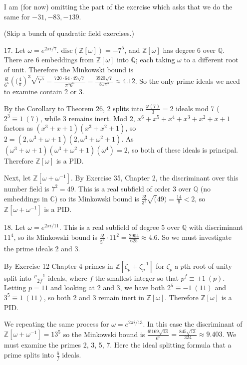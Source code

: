 \documentclass{article}
\newcommand{\w}[0]{\omega}
\newcommand{\z}[0]{\zeta}
\newcommand{\Q}[0]{\mathbb{Q}}
\newcommand{\C}[0]{\mathbb{C}}
\newcommand{\Z}[0]{\mathbb{Z}}
\newcommand{\disc}[1]{\text{disc}(#1)}
\newcommand{\modequiv}[3]{#1 \equiv #2\ (#3)}
\begin{document}
\begin{enumerate}
    I am (for now) omitting the part of the exercise which asks that we do the same for $-31, -83, -139$.

    (Skip a bunch of quadratic field exercises.)

    \item [17.] Let $\w = e^{2\pi i / 7}$.  $\disc{\Z[\w]} = -7^5$, and $\Z[\w]$ has degree 6 over $\Q$.  There are 6 embeddings from $\Z[\w]$ into $\Q$; each taking $\w$ to a different root of unit.  Therefore the Minkowski bound is $\frac{6!}{6^6}\left((\frac{4}{\pi}\right)^{3}\sqrt{7^5} = \frac{720 \cdot 64 \cdot 49\sqrt{7}}{\pi^3 6^6} = \frac{3920\sqrt{7}}{81\pi^3} \approx 4.12$.  So the only prime ideals we need to examine contain 2 or 3.

    By the Corollary to Theorem 26, $2$ splits into $\frac{\varphi(7)}{3} = 2$ ideals mod 7 ($\modequiv{2^3}{1}{7}$, while $3$ remains inert.  Mod 2, $x^6 + x^5 + x^4 + x^3 + x^2 + x + 1$ factors as $(x^3 + x + 1)(x^3 + x^2 + 1)$, so $2 = (2, \w^3 + \w + 1)(2, \w^3 + \w^2 + 1)$.  As $(\w^3 + \w + 1)(\w^3 + \w^2 + 1)(\w^4) = 2$, so both of these ideals is principal.  Therefore $\Z[\w]$ is a PID.

    Next, let $\Z[\w + \w^{-1}]$.  By Exercise 35, Chapter 2, the discriminant over this number field is $7^{2} = 49$.  This is a real subfield of order 3 over $\Q$ (no embeddings in $\C$) so its Minkowski bound is $\frac{3!}{3^3}{\sqrt(49)} = \frac{14}{9} < 2$, so $\Z[\w + \w^{-1}]$ is a PID.

    \item[18.] Let $\w = e^{2\pi i / 11}$.
    This is a real subfield of degree 5 over $\Q$ with discriminant $11^{4}$, so its Minkowski bound is $\frac{5!}{5^5}\cdot 11^2 = \frac{2904}{625} \approx 4.6$.  So we must investigate the prime ideals 2 and 3.

    By Exercise 12 Chapter 4 primes in $\Z[\z_{p} + \z_{p}^{-1}]$ for $\z_{p}$ a $p$th root of unity split into $\frac{p - 1}{2f}$ ideals, where $f$ the smallest integer so that $\modequiv{p^f}{\pm 1}{p}$.  Letting $p = 11$ and looking at 2 and 3, we have both $\modequiv{2^5}{-1}{11}$ and $\modequiv{3^5}{1}{11}$, so both 2 and 3 remain inert in $\Z[\w]$.  Therefore $\Z[\w]$ is a PID.

    We repeating the same process for $\w = e^{2\pi i / 13}$.  In this case the discriminant of $\Z[\w + \w^{-1}] = 13^{5}$ so the Minkowski bound is $\frac{6! 169 \sqrt{13}}{6^6} = \frac{845\sqrt{13}}{324} \approx 9.403$.  We must examine the primes 2, 3, 5, 7.  Here the ideal splitting formula that a prime splits into $\frac{6}{f}$ ideals.


\end{enumerate}
\end{document}
